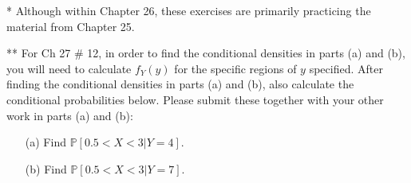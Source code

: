 \documentclass[12pt]{article}
\begin{document}
\begin{center}
\begin{tabular}{|c|c||c|}

%
%


\end{tabular}
\end{center}



\vspace{.1cm}






* Although within Chapter 26, these exercises are primarily practicing the material from Chapter 25. 




\vspace{.1cm}
** For Ch 27 \# 12, in order to find the conditional densities in parts (a) and (b), you will need to calculate $f_Y(y)$ for the specific regions of $y$ specified. \newline
 After finding the conditional densities in parts (a) and (b), also calculate the conditional probabilities below. Please submit these together with your other work in parts (a) and (b): 
\begin{itemize}
\item[(a)]   Find $\mathbb{P}[0.5 < X < 3 | Y = 4]$.
\item[(b)]   Find $\mathbb{P}[0.5 < X < 3 | Y = 7]$.
\end{itemize}
\end{document}
